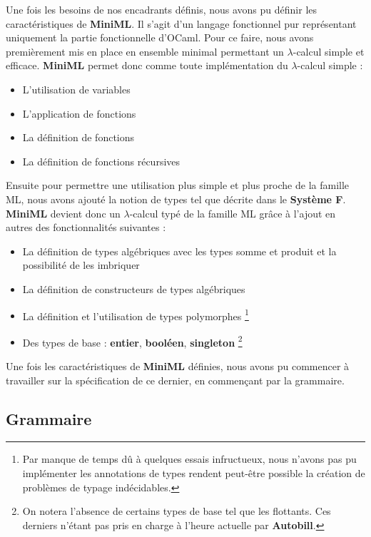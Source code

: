 \documentclass[12pt]{article}
\begin{document}
Une fois les besoins de nos encadrants définis, nous avons pu définir les caractéristiques de \textbf{MiniML}.
Il s'agit d'un langage fonctionnel pur représentant uniquement la partie fonctionnelle d'OCaml.
Pour ce faire, nous avons premièrement mis en place en ensemble minimal permettant un $\lambda$-calcul simple et efficace.
\textbf{MiniML} permet donc comme toute implémentation du $\lambda$-calcul simple :
\begin{itemize}
      \item L'utilisation de variables
      \item L'application de fonctions
      \item La définition de fonctions
      \item La définition de fonctions récursives
\end{itemize}
Ensuite pour permettre une utilisation plus simple et plus proche de la famille ML, nous avons ajouté la notion de types tel que décrite dans le \textbf{Système F}\cite{SystemF}.\\
\textbf{MiniML} devient donc un $\lambda$-calcul typé de la famille ML grâce à l'ajout en autres des fonctionnalités suivantes :
\begin{itemize}
      \item La définition de types algébriques avec les types somme et produit et la possibilité de les imbriquer
      \item La définition de constructeurs de types algébriques
    \item La définition et l'utilisation de types polymorphes \footnote{Par manque de temps dû à quelques essais infructueux, nous n'avons pas pu implémenter les annotations de types rendent peut-être possible la création de problèmes de typage indécidables.}
      \item Des types de base : \textbf{entier}, \textbf{booléen}, \textbf{singleton}
        \footnote{On notera l'absence de certains types de base tel que les flottants. Ces derniers n'étant pas pris en charge à l'heure actuelle par \textbf{Autobill}.}
\end{itemize}
\hfill \break
Une fois les caractéristiques de \textbf{MiniML} définies, nous avons pu commencer à travailler sur la spécification de ce dernier, en commençant par la grammaire.
\hfill \break
\pagebreak

\hypertarget{grammaire}{%
      \subsection{Grammaire}\label{grammaire}}
\end{document}
